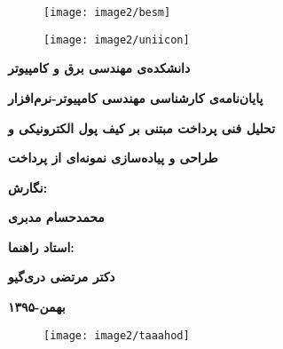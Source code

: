 \documentclass[oneside]{report}
\begin{document}
\newcommand\addHarfi{\harfi{MyC}\addtocounter{MyC}{1}\ }
\setcounter{MyC}{1}

\begin{figure}[h]
	\centering
	\texttt{[image: image2/besm]}
	\label{fig:besm}
\end{figure}

\newpage
{}
\begin{figure}
	\centering
	\texttt{[image: image2/uniicon]}
	\label{fig:uniicon}
\end{figure}

\begin{center}
	
	\textbf{\huge دانشکده‌ی مهندسی برق و کامپیوتر}

\vspace*{1cm}	

	\textbf{\Huge پایان‌نامه‌ی کارشناسی مهندسی کامپیوتر-نرم‌افزار}

\vspace*{2cm}

	\textbf{\Huge تحلیل فنی پرداخت مبتنی بر کیف پول الکترونیکی و }
	
	\vspace*{0.5cm}
	
	\textbf{\Huge طراحی و پیاده‌سازی نمونه‌ای از پرداخت}

\vspace*{2cm}
	
\textbf{\LARGE نگارش:}

\vspace*{0.5cm}

	\textbf{\Huge محمد‌حسام مدبری}

\vspace*{2cm}

	\textbf{\LARGE استاد راهنما:}
	
	\vspace*{0.5cm}
	
		\textbf{\Huge  دکتر مرتضی دری‌گیو}
	
	\vspace*{4cm}
	
			\textbf{\Huge  بهمن-۱۳۹۵}
	
\end{center}

\newpage

\begin{figure}[h]
	\centering
	\texttt{[image: image2/taaahod]}
	\label{fig:taaahod}
\end{figure}
\end{document}
